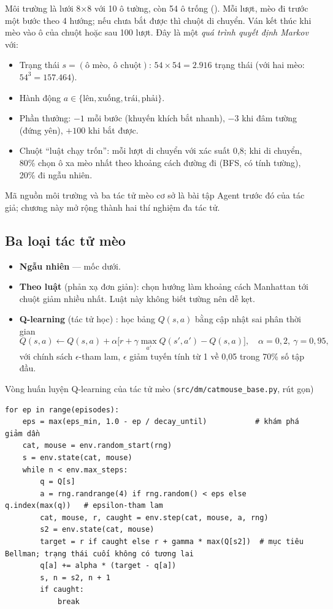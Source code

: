 Môi trường là lưới 8×8 với 10 ô tường, còn 54 ô trống (). Mỗi lượt, mèo đi trước một bước theo 4 hướng; nếu chưa bắt được thì chuột di chuyển. Ván kết thúc khi mèo vào ô của chuột hoặc sau 100 lượt. Đây là một \emph{quá trình quyết định Markov} với:
\begin{itemize}
  \item Trạng thái $s=(\text{ô mèo},\ \text{ô chuột})$: $54\times54=2.916$ trạng thái (với hai mèo: $54^3=157.464$).
  \item Hành động $a\in\{\text{lên},\text{xuống},\text{trái},\text{phải}\}$.
  \item Phần thưởng: $-1$ mỗi bước (khuyến khích bắt nhanh), $-3$ khi đâm tường (đứng yên), $+100$ khi bắt được.
  \item Chuột ``luật chạy trốn'': mỗi lượt di chuyển với xác suất 0,8; khi di chuyển, 80\% chọn ô xa mèo nhất theo khoảng cách đường đi (BFS, có tính tường), 20\% đi ngẫu nhiên.
\end{itemize}
Mã nguồn môi trường và ba tác tử mèo cơ sở là bài tập Agent trước đó của tác giả; chương này mở rộng thành hai thí nghiệm đa tác tử.

\subsection{Ba loại tác tử mèo}

\begin{itemize}
  \item \textbf{Ngẫu nhiên} — mốc dưới.
  \item \textbf{Theo luật} (phản xạ đơn giản): chọn hướng làm khoảng cách Manhattan tới chuột giảm nhiều nhất. Luật này không biết tường nên dễ kẹt.
  \item \textbf{Q-learning} (tác tử học) \cite{watkins1992,sutton2018}: học bảng $Q(s,a)$ bằng cập nhật sai phân thời gian
  \begin{equation}
  Q(s,a)\leftarrow Q(s,a)+\alpha\big[r+\gamma\max_{a'}Q(s',a')-Q(s,a)\big],\quad \alpha=0{,}2,\ \gamma=0{,}95,
  \end{equation}
  với chính sách $\epsilon$-tham lam, $\epsilon$ giảm tuyến tính từ 1 về 0,05 trong 70\% số tập đầu.
\end{itemize}

\begin{code}{Vòng huấn luyện Q-learning của tác tử mèo (\texttt{src/dm/catmouse\_base.py}, rút gọn)}
\label{lst:ch7-qcat}
\begin{verbatim}
for ep in range(episodes):
    eps = max(eps_min, 1.0 - ep / decay_until)           # khám phá giảm dần
    cat, mouse = env.random_start(rng)
    s = env.state(cat, mouse)
    while n < env.max_steps:
        q = Q[s]
        a = rng.randrange(4) if rng.random() < eps else q.index(max(q))   # epsilon-tham lam
        cat, mouse, r, caught = env.step(cat, mouse, a, rng)
        s2 = env.state(cat, mouse)
        target = r if caught else r + gamma * max(Q[s2])  # mục tiêu Bellman; trạng thái cuối không có tương lai
        q[a] += alpha * (target - q[a])
        s, n = s2, n + 1
        if caught:
            break
\end{verbatim}
\end{code}

